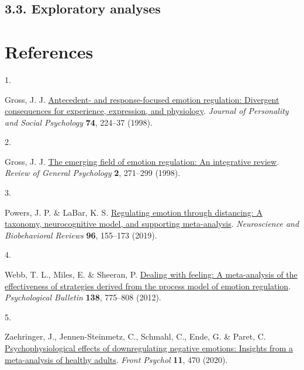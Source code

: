 \documentclass[
  man,floatsintext]{apa6}
\newlength{\cslhangindent}
\newlength{\csllabelwidth}
\newlength{\cslentryspacingunit} %
\newenvironment{CSLReferences}[2] %
 {%
  \setlength{\parindent}{0pt}
  \ifodd #1
  \let\oldpar\par
  \def\par{\hangindent=\cslhangindent\oldpar}
  \fi
  \setlength{\parskip}{#2\cslentryspacingunit}
 }%
 {}
\newcommand{\CSLLeftMargin}[1]{\parbox[t]{\csllabelwidth}{#1}}
\newcommand{\CSLRightInline}[1]{\parbox[t]{\linewidth - \csllabelwidth}{#1}\break}
\begin{document}
\hypertarget{exploratory-analyses}{%
\subsection{3.3. Exploratory analyses}\label{exploratory-analyses}}

\hypertarget{references}{%
\section{References}\label{references}}

\begingroup
\setlength{\parindent}{-0.5in}
\setlength{\leftskip}{0.5in}

\hypertarget{refs}{}
\begin{CSLReferences}{0}{0}
\leavevmode{}%
\CSLLeftMargin{1. }%
\CSLRightInline{Gross, J. J. \href{https://doi.org/10.1037/0022-3514.74.1.224}{Antecedent- and response-focused emotion regulation: Divergent consequences for experience, expression, and physiology}. \emph{Journal of Personality and Social Psychology} \textbf{74}, 224--37 (1998).}

\leavevmode{}%
\CSLLeftMargin{2. }%
\CSLRightInline{Gross, J. J. \href{https://doi.org/10.1037/1089-2680.2.3.271}{The emerging field of emotion regulation: An integrative review}. \emph{Review of General Psychology} \textbf{2}, 271--299 (1998).}

\leavevmode{}%
\CSLLeftMargin{3. }%
\CSLRightInline{Powers, J. P. \& LaBar, K. S. \href{https://doi.org/10.1016/j.neubiorev.2018.04.023}{Regulating emotion through distancing: A taxonomy, neurocognitive model, and supporting meta-analysis}. \emph{Neuroscience and Biobehavioral Reviews} \textbf{96}, 155--173 (2019).}

\leavevmode{}%
\CSLLeftMargin{4. }%
\CSLRightInline{Webb, T. L., Miles, E. \& Sheeran, P. \href{https://doi.org/10.1037/a0027600}{Dealing with feeling: A meta-analysis of the effectiveness of strategies derived from the process model of emotion regulation}. \emph{Psychological Bulletin} \textbf{138}, 775--808 (2012).}

\leavevmode{}%
\CSLLeftMargin{5. }%
\CSLRightInline{Zaehringer, J., Jennen-Steinmetz, C., Schmahl, C., Ende, G. \& Paret, C. \href{https://doi.org/10.3389/fpsyg.2020.00470}{Psychophysiological effects of downregulating negative emotions: Insights from a meta-analysis of healthy adults}. \emph{Front Psychol} \textbf{11}, 470 (2020).}


\end{CSLReferences}
\end{document}
